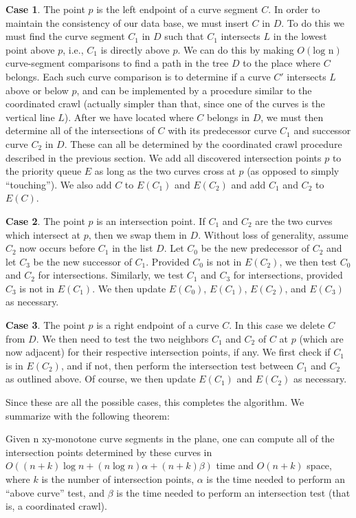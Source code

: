 {\bf Case 1}. The point $p$ is the left endpoint of a curve segment $C$.
In order to maintain the consistency of our data base, we must insert $C$ in $D$.
To do this we must find the curve segment $C_{1}$ in $D$ such that $C_{1}$
intersects $L$ in the lowest point above $p$, i.e., $C_{1}$ is directly above $p$.
We can do this by making $O(\mbox{log n})$ curve-segment comparisons to find
a path in the tree $D$ to the place where $C$ belongs.
Each such curve comparison is to determine if a curve $C'$ intersects $L$ above
or below $p$, and can be implemented by a procedure similar to the coordinated
crawl (actually simpler than that, since one of the curves is the vertical line $L$).
After we have located where $C$ belongs in $D$, we must then determine all of the
intersections of $C$ with its predecessor curve $C_{1}$ and successor curve $C_{2}$
in $D$. These can all be determined by the coordinated crawl procedure described
in the previous section.
We add all discovered intersection points $p$ to the priority queue $E$ as long 
as the two curves cross at $p$ (as opposed to simply ``touching'').
We also add $C$ to $E(C_{1})$ and $E(C_{2})$ and add $C_{1}$ and $C_{2}$ to $E(C)$.

{\bf Case 2}. The point $p$ is an intersection point.
If $C_{1}$ and $C_{2}$ are the two curves which intersect at $p$, then we swap them
in $D$.  Without loss of generality, assume $C_{2}$ now occurs before $C_{1}$ in the
list  $D$.  Let $C_{0}$ be the new predecessor of $C_{2}$ and let $C_{3}$ be the 
new successor of $C_{1}$.
Provided $C_{0}$ is not in $E(C_{2})$, we then test $C_{0}$ and $C_{2}$ for
intersections.  Similarly, we test $C_{1}$ and $C_{3}$ for intersections, provided
$C_{3}$ is not in $E(C_{1})$. 
We then update $E(C_{0})$, $E(C_{1})$, $E(C_{2})$, and $E(C_{3})$ as necessary.

{\bf Case 3}.  The point $p$ is a right endpoint of a curve $C$.
In this case we delete $C$ from $D$.
We then need to test the two neighbors $C_{1}$ and $C_{2}$ of $C$ at $p$
(which are now adjacent) for their respective intersection points, if any.
We first check if $C_{1}$ is in $E(C_{2})$, and if not, then perform the intersection
test between $C_{1}$ and $C_{2}$ as outlined above.
Of course, we then update $E(C_{1})$ and  $E(C_{2})$ as necessary.

Since these are all the possible cases, this completes the algorithm.
We summarize with the following theorem:
\begin{theorem}
Given n xy-monotone curve segments in the plane, one can compute all of 
the intersection points determined by these curves in 
$O((n+k)\log n + (n \log n) \alpha + (n+k) \beta)$ time and
$O(n+k)$ space, where $k$ is the number of intersection points, 
$\alpha$ is the time needed to perform an ``above curve'' test, 
and $\beta$ is the time needed to perform an intersection test
(that is, a coordinated crawl). \QED
\end{theorem}

